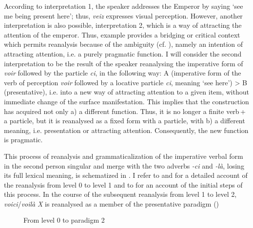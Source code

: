 \documentclass[output=paper]{langsci/langscibook}
\begin{document}
According to interpretation 1, the speaker addresses the Emperor by saying ‘see me being present here’; thus, \textit{veiz} expresses visual perception. However, another interpretation is also possible, interpretation 2, which is a way of attracting the attention of the emperor. Thus, example  provides a bridging or critical context which permits reanalysis because of the ambiguity (cf. \citealt{Diewald2002, Heine2002}), namely an intention of attracting attention, i.e. a purely pragmatic function. I will consider the second interpretation to be the result of the speaker reanalysing the imperative form of \textit{voir} followed by the particle \textit{ci}, in the following way: A (imperative form of the verb of perception \textit{voir} followed by a locative particle \textit{ci}, meaning ‘see here’) > B (presentative), i.e. into a new way of attracting attention to a given item, without immediate change of the surface manifestation. This implies that the construction has acquired not only a) a different function. Thus, it is no longer a finite verb\,+\,a particle, but it is reanalysed as a fixed form with a particle, with b) a different meaning, i.e. presentation or attracting attention. Consequently, the new function is pragmatic. 

This process of reanalysis and grammaticalization of the imperative verbal form in the second person singular and merge with the two adverbs \textit{{}-ci} and \textit{{}-là}, losing its full lexical meaning, is schematized in . I refer to \citet[212--216]{KraghStrudsholm2013} and \citet[190--191]{KraghSchosler2014} for a detailed account of the reanalysis from level 0 to level 1 and to \citet{OppermannMarsaux2006} for an account of the initial steps of this process. In the course of the subsequent reanalysis from level 1 to level 2, \textit{voici}/\textit{voilà} \textit{X} is reanalysed as a member of the presentative paradigm ()

  
\begin{figure}
 \caption{From level 0 to paradigm 2\label{fig:kragh:4}}
 \end{figure}
\end{document}
